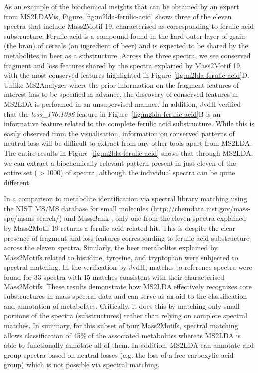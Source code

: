 As an example of the biochemical insights that can be obtained by an expert from MS2LDAVis, Figure~\ref{fig:m2lda-ferulic-acid} shows three of the eleven spectra that include Mass2Motif 19, characterised as corresponding to ferulic acid substructure. Ferulic acid is a compound found in the hard outer layer of grain (the bran) of cereals (an ingredient of beer) and is expected to be shared by the metabolites in beer as a substructure. Across the three spectra, we see conserved fragment and loss features shared by the spectra explained by Mass2Motif 19, with the most conserved features highlighted in Figure~\ref{fig:m2lda-ferulic-acid}D. Unlike MS2Analyzer \cite{ma2014ms2analyzer} where the prior information on the fragment features of interest has to be specified in advance, the discovery of conserved features in MS2LDA is performed in an unsupervised manner. In addition, JvdH verified that the \textit{loss_176.1086} feature in Figure~\ref{fig:m2lda-ferulic-acid}B is an informative feature related to the complete ferulic acid substructure. While this is easily observed from the visualisation, information on conserved patterns of neutral loss will be difficult to extract from any other tools apart from MS2LDA. The entire results in Figure~\ref{fig:m2lda-ferulic-acid} shows that through MS2LDA, we can extract a biochemically relevant pattern present in just eleven of the entire set ($>$1000) of spectra, although the individual spectra can be quite different. 

In a comparison to metabolite identification via spectral library matching using the NIST MS/MS database for small molecules (http://chemdata.nist.gov/mass-spc/msms-search/) and MassBank \cite{horai2010massbank}, only one from the eleven spectra explained by Mass2Motif 19 returns a ferulic acid related hit. This is despite the clear presence of fragment and loss features corresponding to ferulic acid substructure across the eleven spectra. Similarly, the beer metabolites explained by Mass2Motifs related to histidine, tyrosine, and tryptophan were subjected to spectral matching. In the verification by JvdH, matches to reference spectra were found for 33 spectra with 15 matches consistent with their characterised Mass2Motifs. These results demonstrate how MS2LDA effectively recognizes core substructures in mass spectral data and can serve as an aid to the classification and annotation of metabolites. Critically, it does this by matching only small portions of the spectra (substructures) rather than relying on complete spectral matches. In summary, for this subset of four Mass2Motifs, spectral matching allows classification of 45\% of the associated metabolites whereas MS2LDA is able to functionally annotate all of them. In addition, MS2LDA can annotate and group spectra based on neutral losses (e.g. the loss of a free carboxylic acid group) which is not possible via spectral matching.

